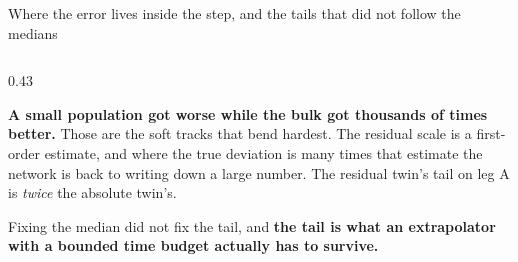 \documentclass[aspectratio=169,10pt]{beamer}
\newcommand{\hl}[1]{{\color{accent}\textbf{#1}}}
\newcommand{\bad}[1]{{\color{warm}\textbf{#1}}}
\begin{document}
\begin{frame}[shrink=25]{Where the error lives inside the step, and the tails that did not follow the medians}
\begin{columns}[T]
\begin{column}{0.43\textwidth}
      {\small \bad{A small population got worse while the bulk got thousands of
       times better.} Those are the soft tracks that bend hardest. The residual
       scale is a first-order estimate, and where the true deviation is many
       times that estimate the network is back to writing down a large number.
       The residual twin's tail on leg A is \emph{twice} the absolute twin's.
       \smallskip

       Fixing the median did not fix the tail, and \hl{the tail is what an
       extrapolator with a bounded time budget actually has to survive.}}
    \end{column}
  \end{columns}
\end{frame}

\end{document}
